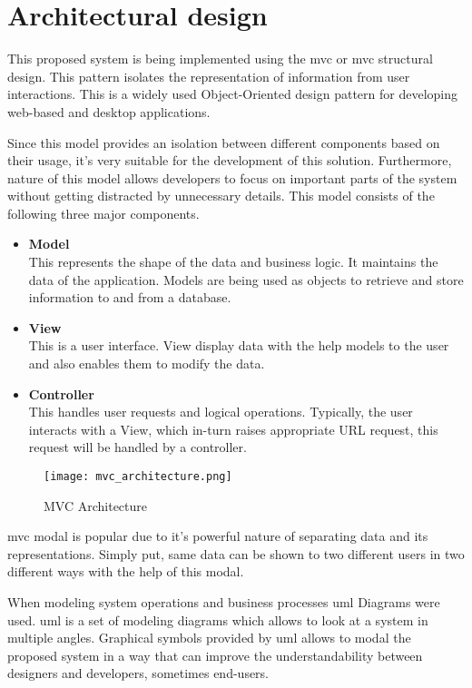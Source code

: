 \documentclass[12pt]{report}
\begin{document}
\section{Architectural design}
This proposed system is being implemented using the \acrshort{mvc} or \acrlong{mvc} structural design. This pattern isolates the representation of information from user interactions. This is a widely used Object-Oriented design pattern for developing web-based and desktop applications.

Since this model provides an isolation between different components based on their  usage, it’s very suitable for the development of this solution. Furthermore, nature of this model allows developers to focus on important parts of the system without getting distracted by unnecessary details. This model consists of the following three major components.

\begin{itemize}
	\item {\bf{Model}}\\
	      This represents the shape of the data and business logic. It maintains the data of the application. Models are being used as objects to retrieve and store information to and from a database.

	\item {\bf{View}}\\
	      This is a user interface. View display data with the help models to the user and also enables them to modify the data.

	\item {\bf{Controller}}\\
	      This handles user requests and logical operations. Typically, the user interacts with a View, which in-turn raises appropriate URL request, this request will be handled by a controller.
\end{itemize}

\begin{figure}[H]
	\centering
	\texttt{[image: mvc\_architecture.png]}
	\caption{MVC Architecture}
\end{figure}

\acrshort{mvc} modal is popular due to it’s powerful nature of separating data and its representations. Simply put, same data can be shown to two different users in two different ways with the help of this modal.

When modeling system operations and business processes \acrshort{uml} Diagrams were used. \acrshort{uml} is a set of modeling diagrams which allows to look at a system in multiple angles. Graphical symbols provided by \acrshort{uml} allows to modal the proposed system in a way that can improve the understandability between designers and developers, sometimes end-users.
\end{document}
